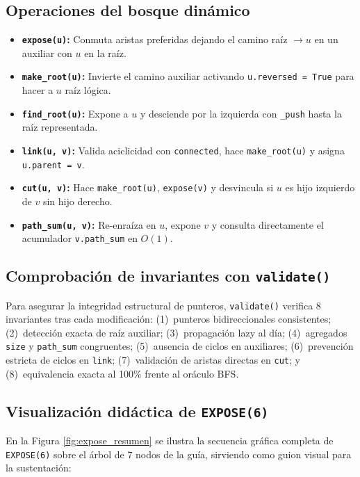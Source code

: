 \subsection{Operaciones del bosque dinámico}
\begin{itemize}\setlength\itemsep{-2pt}\setlength\parskip{0pt}\small
    \item \textbf{\texttt{expose(u)}:} Conmuta aristas preferidas dejando el camino raíz $\to u$ en un auxiliar con $u$ en la raíz.
    \item \textbf{\texttt{make\_root(u)}:} Invierte el camino auxiliar activando \texttt{u.reversed = True} para hacer a $u$ raíz lógica.
    \item \textbf{\texttt{find\_root(u)}:} Expone a $u$ y desciende por la izquierda con \texttt{\_push} hasta la raíz representada.
    \item \textbf{\texttt{link(u, v)}:} Valida aciclicidad con \texttt{connected}, hace \texttt{make\_root(u)} y asigna \texttt{u.parent = v}.
    \item \textbf{\texttt{cut(u, v)}:} Hace \texttt{make\_root(u)}, \texttt{expose(v)} y desvincula si $u$ es hijo izquierdo de $v$ sin hijo derecho.
    \item \textbf{\texttt{path\_sum(u, v)}:} Re-enraíza en $u$, expone $v$ y consulta directamente el acumulador \texttt{v.path\_sum} en $O(1)$.
\end{itemize}

\subsection{Comprobación de invariantes con \texttt{validate()}}
Para asegurar la integridad estructural de punteros, \texttt{validate()} verifica 8 invariantes tras cada modificación:
(1)~punteros bidireccionales consistentes; (2)~detección exacta de raíz auxiliar; (3)~propagación lazy al día; (4)~agregados \texttt{size} y \texttt{path\_sum} congruentes; (5)~ausencia de ciclos en auxiliares; (6)~prevención estricta de ciclos en \texttt{link}; (7)~validación de aristas directas en \texttt{cut}; y (8)~equivalencia exacta al 100\% frente al oráculo BFS.

\clearpage
\subsection{Visualización didáctica de \texttt{EXPOSE(6)}}
En la Figura \ref{fig:expose_resumen} se ilustra la secuencia gráfica completa de \texttt{EXPOSE(6)} sobre el árbol de 7 nodos de la guía, sirviendo como guion visual para la sustentación:

